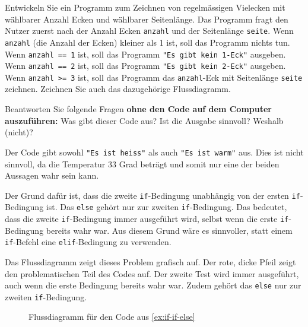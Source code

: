 \begin{myexercise}
	Entwickeln Sie ein Programm zum Zeichnen von regelmässigen Vielecken mit wählbarer Anzahl Ecken und wählbarer Seitenlänge. Das Programm fragt den Nutzer zuerst nach der Anzahl Ecken \lstinline|anzahl| und der Seitenlänge \lstinline|seite|. Wenn \lstinline|anzahl| (die Anzahl der Ecken) kleiner als 1 ist, soll das Programm nichts tun. Wenn \lstinline|anzahl == 1| ist, soll das Programm
	\lstinline|"Es gibt kein 1-Eck"| ausgeben. Wenn \lstinline|anzahl == 2| ist, soll das Programm
	\lstinline|"Es gibt kein 2-Eck"| ausgeben. Wenn \lstinline|anzahl >= 3| ist, soll das Programm das \lstinline|anzahl|-Eck mit Seitenlänge \lstinline|seite| zeichnen. Zeichnen Sie auch das dazugehörige Flussdiagramm.
	\begin{myanswer}
		
	\end{myanswer}
\end{myexercise}

\begin{myexercise}\label{ex:if-if-else}
	Beantworten Sie folgende Fragen \textbf{ohne den Code auf dem Computer auszuführen:} Was gibt dieser Code aus? Ist die Ausgabe sinnvoll? Weshalb (nicht)?
	
	\begin{myanswer}
		Der Code gibt sowohl \lstinline|"Es ist heiss"| als auch \lstinline|"Es ist warm"| aus. Dies ist nicht sinnvoll, da die Temperatur 33 Grad beträgt und somit nur eine der beiden Aussagen wahr sein kann.

		Der Grund dafür ist, dass die zweite \lstinline|if|-Bedingung unabhängig von der ersten \lstinline|if|-Bedingung ist. Das \lstinline|else| gehört nur zur zweiten \lstinline|if|-Bedingung. Das bedeutet, dass die zweite \lstinline|if|-Bedingung immer ausgeführt wird, selbst wenn die erste \lstinline|if|-Bedingung bereits wahr war. Aus diesem Grund wäre es sinnvoller, statt einem \lstinline|if|-Befehl eine \lstinline|elif|-Bedingung zu verwenden.

		Das Flussdiagramm zeigt dieses Problem grafisch auf. Der rote, dicke Pfeil zeigt den problematischen Teil des Codes auf. Der zweite Test wird immer ausgeführt, auch wenn die erste Bedingung bereits wahr war. Zudem gehört das \lstinline|else| nur zur zweiten \lstinline|if|-Bedingung.

		\begin{figure}[H]
			\centering
			
			\caption{Flussdiagramm für den Code aus \cref{ex:if-if-else}}
			\label{fig:if-if-else}
		\end{figure}
	\end{myanswer}
\end{myexercise}


